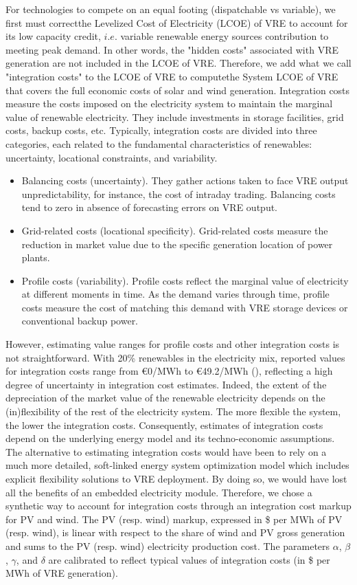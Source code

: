 For technologies to compete on an equal footing (dispatchable vs variable), we first must correctthe  Levelized Cost of Electricity (LCOE) of VRE to account for its low capacity credit, $i.e.$ variable renewable energy sources contribution to meeting peak demand. In other words, the "hidden costs" associated with VRE generation are not included in the LCOE of VRE. Therefore, we add what we call "integration costs" to the LCOE of VRE to computethe System LCOE of VRE that covers the full economic costs of solar and wind generation. Integration costs measure the costs imposed on the electricity system to maintain the marginal value of renewable electricity. They include investments in storage facilities, grid costs, backup costs, etc. Typically, integration costs are divided into three categories, each related to the fundamental characteristics of renewables: uncertainty, locational constraints, and variability.
\begin{itemize}
    \item Balancing costs (uncertainty). They gather actions taken to face VRE output unpredictability, for instance, the cost of intraday trading. Balancing costs tend to zero in absence of forecasting errors on VRE output.
    \item Grid-related costs (locational specificity). Grid-related costs measure the reduction in market value due to the specific generation location of power plants.
    \item Profile costs (variability). Profile costs reflect the marginal value of electricity at different moments in time. As the demand varies through time, profile costs measure the cost of matching this demand with VRE storage devices or conventional backup power.
\end{itemize}

However, estimating value ranges for profile costs and other integration costs is not straightforward. With 20\% renewables in the electricity mix, reported values for integration costs range from €0/MWh to €49.2/MWh (\cite{Heptonstall2021}), reflecting a high degree of uncertainty in integration cost estimates. Indeed, the extent of the depreciation of the market value of the renewable electricity depends on the (in)flexibility of the rest of the electricity system. The more flexible the system, the lower the integration costs. Consequently, estimates of integration costs depend on the underlying energy model and its techno-economic assumptions. The alternative to estimating integration costs would have been to rely on a much more detailed, soft-linked energy system optimization model which includes explicit flexibility solutions to VRE deployment. By doing so, we would have lost all the benefits of an embedded electricity module. Therefore, we chose a synthetic way to account for integration costs through an integration cost markup for PV and wind. The PV (resp. wind) markup, expressed in \$ per MWh of PV (resp. wind), is linear with respect to the share of wind and PV gross generation and sums to the PV (resp. wind) electricity production cost. The parameters $\alpha$, $\beta$, $\gamma$, and $\delta$ are calibrated to reflect typical values of integration costs (in \$ per MWh of VRE generation).

